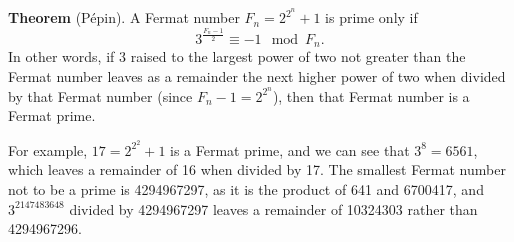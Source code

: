 \documentclass[12pt]{article}
\begin{document}
{\bf Theorem} (P\'epin). A Fermat number $F_n = 2^{2^n} + 1$ is prime only if $$3^{\frac{F_n - 1}{2}} \equiv -1 \mod F_n.$$ In other words, if 3 raised to the largest power of two not greater than the Fermat number leaves as a remainder the next higher power of two when divided by that Fermat number (since $F_n - 1 = 2^{2^n}$), then that Fermat number is a Fermat prime.

For example, $17 = 2^{2^2} + 1$ is a Fermat prime, and we can see that $3^8 = 6561$, which leaves a remainder of 16 when divided by 17. The smallest Fermat number not to be a prime is 4294967297, as it is the product of 641 and 6700417, and $3^{2147483648}$ divided by 4294967297 leaves a remainder of 10324303 rather than 4294967296.
\end{document}
